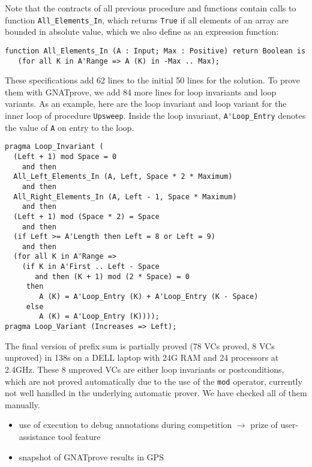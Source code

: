 \documentclass[sttt,draft]{svjour}
\newcommand{\gnatprove}{GNATprove\xspace}
\begin{document}
Note that the contracts of all previous procedure and functions contain calls
to function \verb|All_Elements_In|, which returns \verb|True| if all elements
of an array are bounded in absolute value, which we also define as an
expression function:

\begin{footnotesize}
\begin{verbatim}
function All_Elements_In (A : Input; Max : Positive) return Boolean is
   (for all K in A'Range => A (K) in -Max .. Max);
\end{verbatim}
\end{footnotesize}

These specifications add 62 lines to the initial 50 lines for the solution. To
prove them with \gnatprove, we add 84 more lines for loop invariants and loop
variants. As an example, here are the loop invariant and loop variant for the
inner loop of procedure \verb|Upsweep|. Inside the loop invariant,
\verb|A'Loop_Entry| denotes the value of \verb|A| on entry to the loop.

\begin{footnotesize}
\begin{verbatim}
pragma Loop_Invariant (
  (Left + 1) mod Space = 0
    and then
  All_Left_Elements_In (A, Left, Space * 2 * Maximum)
    and then
  All_Right_Elements_In (A, Left - 1, Space * Maximum)
    and then
  (Left + 1) mod (Space * 2) = Space
    and then
  (if Left >= A'Length then Left = 8 or Left = 9)
    and then
  (for all K in A'Range =>
    (if K in A'First .. Left - Space
       and then (K + 1) mod (2 * Space) = 0
     then
        A (K) = A'Loop_Entry (K) + A'Loop_Entry (K - Space)
     else
        A (K) = A'Loop_Entry (K))));
pragma Loop_Variant (Increases => Left);
\end{verbatim}
\end{footnotesize}

The final version of prefix sum is partially proved (78 VCs proved, 8 VCs
unproved) in 138s on a DELL laptop with 24G RAM and 24 processors at 2.4GHz.
These 8 unproved VCs are either loop invariants or postconditions, which are
not proved automatically due to the use of the \verb|mod| operator, currently
not well handled in the underlying automatic prover. We have checked all of
them manually.

\begin{itemize}
\item use of execution to debug annotations during competition $\rightarrow$
  prize of user-assistance tool feature
\item snapshot of GNATprove results in GPS
\end{itemize}
\end{document}
